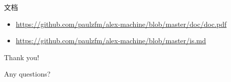 \documentclass{beamer}
\begin{document}
\begin{frame}{文档}
    \begin{itemize}
        \item \url{https://github.com/paulzfm/alex-machine/blob/master/doc/doc.pdf}
        \item \url{https://github.com/paulzfm/alex-machine/blob/master/is.md}
    \end{itemize}
\end{frame}

\begin{frame}
    \begin{center}
        {\huge \color{blue}
            Thank you!
        }
    \end{center}

    \begin{center}
        {\huge \color{blue}
            Any questions?
        }
    \end{center}
\end{frame}
\end{document}
